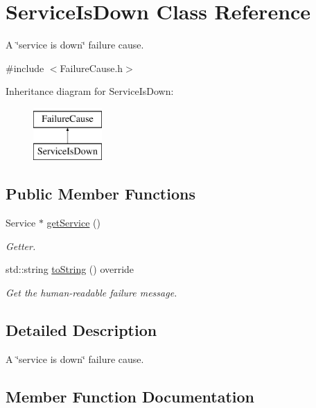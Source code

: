\hypertarget{class_service_is_down}{}\section{Service\+Is\+Down Class Reference}
\label{class_service_is_down}


A \char`\"{}service is down\char`\"{} failure cause.  




{\ttfamily \#include $<$Failure\+Cause.\+h$>$}

Inheritance diagram for Service\+Is\+Down\+:\begin{figure}[H]
\begin{center}
\leavevmode
\includegraphics[height=2.000000cm]{class_service_is_down}
\end{center}
\end{figure}
\subsection*{Public Member Functions}
\begin{DoxyCompactItemize}
\item 
Service $\ast$ \hyperlink{class_service_is_down_ae38789b51be32b2eb5f25e38f2321011}{get\+Service} ()
\begin{DoxyCompactList}\small\item\em Getter. \end{DoxyCompactList}\item 
std\+::string \hyperlink{class_service_is_down_a365459d355d47c6c7b3187ce954afcb8}{to\+String} () override
\begin{DoxyCompactList}\small\item\em Get the human-\/readable failure message. \end{DoxyCompactList}\end{DoxyCompactItemize}


\subsection{Detailed Description}
A \char`\"{}service is down\char`\"{} failure cause. 

\subsection{Member Function Documentation}
\mbox{\label{class_service_is_down_ae38789b51be32b2eb5f25e38f2321011}} 
